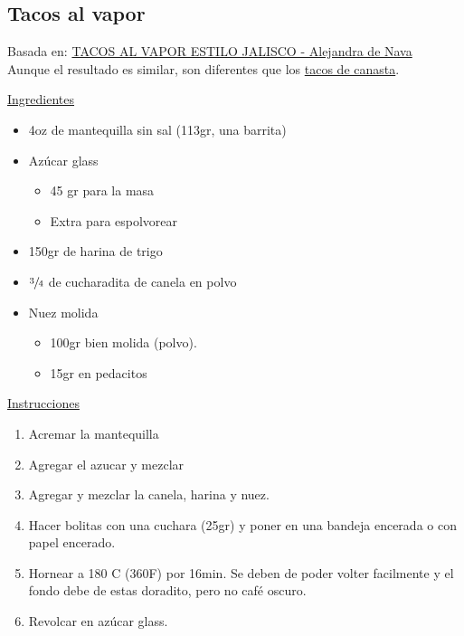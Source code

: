 \subsection{Tacos al vapor}
\label{sec:tacos-al-vapor}

Basada en: \href{https://www.youtube.com/watch?v=PoDRiJ3zVmc}{TACOS AL VAPOR ESTILO JALISCO - Alejandra de Nava} \\

Aunque el resultado es similar, son diferentes que los \href{sec:tacos-de-canasta}{tacos de canasta}.

\underline{Ingredientes}

\begin{itemize}
\item 4oz de mantequilla sin sal (113gr, una barrita)
\item Azúcar glass
\begin{itemize}
\item 45 gr para la masa
\item Extra para espolvorear
\end{itemize}
\item 150gr de harina de trigo
\item $\sfrac{3}{4}$ de cucharadita de canela en polvo
\item Nuez molida
\begin{itemize}
\item 100gr bien molida (polvo).
\item 15gr en pedacitos
\end{itemize}
\end{itemize}


\underline{Instrucciones}

\begin{enumerate}
\item Acremar la mantequilla
\item Agregar el azucar y mezclar
\item Agregar y mezclar la canela, harina y nuez.
\item Hacer bolitas con una cuchara (\Sim 25gr) y poner en una bandeja encerada o con papel encerado.
\item Hornear a 180 C (360F) por \Sim 16min. Se deben de poder volter facilmente y el fondo debe de estas doradito, pero no café oscuro.
\item Revolcar en azúcar glass.
\end{enumerate}

